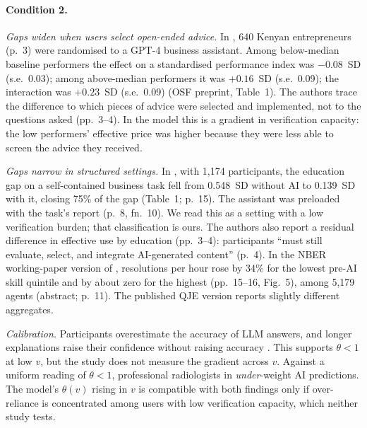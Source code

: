 \documentclass[12pt]{article}
\theoremstyle{remark}
\begin{document}
\paragraph{Condition 2.} \emph{Gaps widen when users select open-ended advice.} In \citet{otis2026uneven}, 640 Kenyan entrepreneurs (p.~3) were randomised to a GPT-4 business assistant. Among below-median baseline performers the effect on a standardised performance index was $-0.08$~SD (s.e.\ 0.03); among above-median performers it was $+0.16$~SD (s.e.\ 0.09); the interaction was $+0.23$~SD (s.e.\ 0.09) (OSF preprint, Table~1). The authors trace the difference to which pieces of advice were selected and implemented, not to the questions asked (pp.~3--4). In the model this is a gradient in verification capacity: the low performers' effective price was higher because they were less able to screen the advice they received.

\emph{Gaps narrow in structured settings.} In \citet{cruces2026narrow}, with 1,174 participants, the education gap on a self-contained business task fell from 0.548~SD without AI to 0.139~SD with it, closing 75\% of the gap (Table~1; p.~15). The assistant was preloaded with the task's report (p.~8, fn.~10). We read this as a setting with a low verification burden; that classification is ours. The authors also report a residual difference in effective use by education (pp.~3--4): participants ``must still evaluate, select, and integrate AI-generated content'' (p.~4). In the NBER working-paper version of \citet{brynjolfsson2025work}, resolutions per hour rose by 34\% for the lowest pre-AI skill quintile and by about zero for the highest (pp.~15--16, Fig.~5), among 5,179 agents (abstract; p.~11). The published QJE version reports slightly different aggregates.

\emph{Calibration.} Participants overestimate the accuracy of LLM answers, and longer explanations raise their confidence without raising accuracy \citep[arXiv v2, pp.~12--13; 301 participants, p.~8]{steyvers2025know}. This supports $\theta<1$ at low $v$, but the study does not measure the gradient across $v$. Against a uniform reading of $\theta<1$, professional radiologists in \citet[abstract]{agarwal2023radiology} \emph{under}-weight AI predictions. The model's $\theta(v)$ rising in $v$ is compatible with both findings only if over-reliance is concentrated among users with low verification capacity, which neither study tests.
\end{document}
